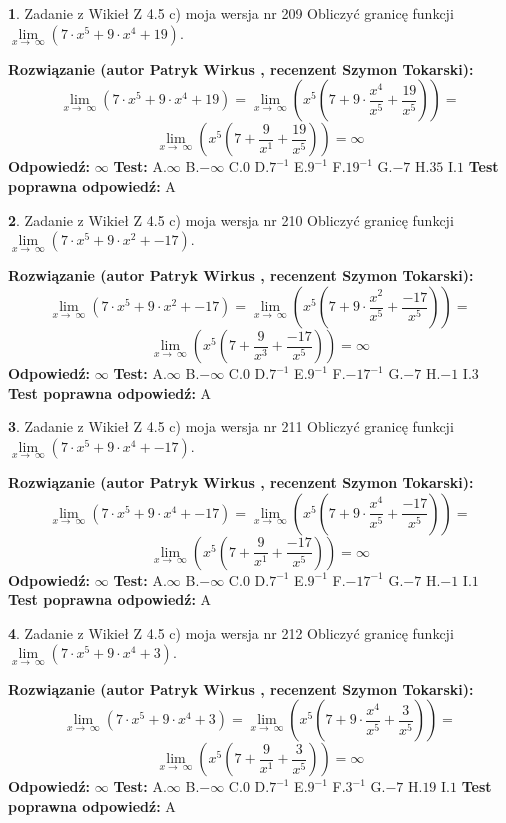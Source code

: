 \documentclass[12pt, a4paper]{article}
\theoremstyle{definition} %
\newtheorem{zad}{}
\newcommand{\zadStart}[1]{\begin{zad}#1\newline}
\newcommand{\zadStop}{\end{zad}}
\newcommand{\rozwStart}[2]{\noindent \textbf{Rozwiązanie (autor #1 , recenzent #2): }\newline}
\newcommand{\rozwStop}{\newline}
\newcommand{\odpStart}{\noindent \textbf{Odpowiedź:}\newline}
\newcommand{\odpStop}{\newline}
\newcommand{\testStart}{\noindent \textbf{Test:}\newline}
\newcommand{\testStop}{\newline}
\newcommand{\kluczStart}{\noindent \textbf{Test poprawna odpowiedź:}\newline}
\newcommand{\kluczStop}{\newline}
\begin{document}
\zadStart{Zadanie z Wikieł Z 4.5 c) moja wersja nr 209}
Obliczyć granicę funkcji  $\lim\limits_{x\to\ \infty}(7 \cdot x^{5}+9 \cdot x^{4}+19)$.
\zadStop
\rozwStart{Patryk Wirkus}{Szymon Tokarski}
$$\lim\limits_{x\to\ \infty}(7 \cdot x^{5}+9 \cdot x^{4}+19) = \lim\limits_{x\to\ \infty}(x^{5}(7 +9 \cdot \frac{x^{4}}{x^{5}}+\frac{19}{x^{5}})) =$$ $$\lim\limits_{x\to\ \infty}(x^{5}(7 +\frac{9}{x^{1}}+\frac{19}{x^{5}})) =\infty$$
\rozwStop
\odpStart
$\infty$
\odpStop
\testStart
A.$\infty$ B.$-\infty$ C.$0$ D.$7^{-1}$ E.$9^{-1}$
F.$19^{-1}$ G.$-7$
H.$35$
I.$1$
\testStop
\kluczStart
A
\kluczStop



\zadStart{Zadanie z Wikieł Z 4.5 c) moja wersja nr 210}
Obliczyć granicę funkcji  $\lim\limits_{x\to\ \infty}(7 \cdot x^{5}+9 \cdot x^{2}+-17)$.
\zadStop
\rozwStart{Patryk Wirkus}{Szymon Tokarski}
$$\lim\limits_{x\to\ \infty}(7 \cdot x^{5}+9 \cdot x^{2}+-17) = \lim\limits_{x\to\ \infty}(x^{5}(7 +9 \cdot \frac{x^{2}}{x^{5}}+\frac{-17}{x^{5}})) =$$ $$\lim\limits_{x\to\ \infty}(x^{5}(7 +\frac{9}{x^{3}}+\frac{-17}{x^{5}})) =\infty$$
\rozwStop
\odpStart
$\infty$
\odpStop
\testStart
A.$\infty$ B.$-\infty$ C.$0$ D.$7^{-1}$ E.$9^{-1}$
F.$-17^{-1}$ G.$-7$
H.$-1$
I.$3$
\testStop
\kluczStart
A
\kluczStop



\zadStart{Zadanie z Wikieł Z 4.5 c) moja wersja nr 211}
Obliczyć granicę funkcji  $\lim\limits_{x\to\ \infty}(7 \cdot x^{5}+9 \cdot x^{4}+-17)$.
\zadStop
\rozwStart{Patryk Wirkus}{Szymon Tokarski}
$$\lim\limits_{x\to\ \infty}(7 \cdot x^{5}+9 \cdot x^{4}+-17) = \lim\limits_{x\to\ \infty}(x^{5}(7 +9 \cdot \frac{x^{4}}{x^{5}}+\frac{-17}{x^{5}})) =$$ $$\lim\limits_{x\to\ \infty}(x^{5}(7 +\frac{9}{x^{1}}+\frac{-17}{x^{5}})) =\infty$$
\rozwStop
\odpStart
$\infty$
\odpStop
\testStart
A.$\infty$ B.$-\infty$ C.$0$ D.$7^{-1}$ E.$9^{-1}$
F.$-17^{-1}$ G.$-7$
H.$-1$
I.$1$
\testStop
\kluczStart
A
\kluczStop



\zadStart{Zadanie z Wikieł Z 4.5 c) moja wersja nr 212}
Obliczyć granicę funkcji  $\lim\limits_{x\to\ \infty}(7 \cdot x^{5}+9 \cdot x^{4}+3)$.
\zadStop
\rozwStart{Patryk Wirkus}{Szymon Tokarski}
$$\lim\limits_{x\to\ \infty}(7 \cdot x^{5}+9 \cdot x^{4}+3) = \lim\limits_{x\to\ \infty}(x^{5}(7 +9 \cdot \frac{x^{4}}{x^{5}}+\frac{3}{x^{5}})) =$$ $$\lim\limits_{x\to\ \infty}(x^{5}(7 +\frac{9}{x^{1}}+\frac{3}{x^{5}})) =\infty$$
\rozwStop
\odpStart
$\infty$
\odpStop
\testStart
A.$\infty$ B.$-\infty$ C.$0$ D.$7^{-1}$ E.$9^{-1}$
F.$3^{-1}$ G.$-7$
H.$19$
I.$1$
\testStop
\kluczStart
A
\kluczStop
\end{document}

